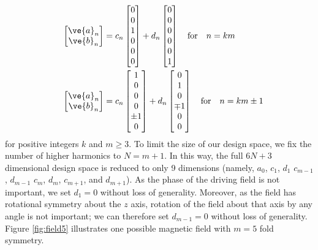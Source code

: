 \begin{align}
    \quad \begin{bmatrix} \ve{a}_{n} \\ \ve{b}_{n} \end{bmatrix} &= c_{n} \begin{bmatrix} 0\\0\\1\\0\\0\\0 \end{bmatrix} + d_{n} \begin{bmatrix} 0\\0\\0\\0\\0\\1 \end{bmatrix} \quad \text{for} \quad n=km
    \\
    \quad \begin{bmatrix} \ve{a}_{n} \\ \ve{b}_{n} \end{bmatrix} &= c_{n} \begin{bmatrix} 1\\0\\0\\0\\\pm1\\0 \end{bmatrix} + d_{n} \begin{bmatrix} 0\\1\\0\\\mp1\\0\\0 \end{bmatrix} \quad \text{for} \quad n=km \pm 1
\end{align}
for positive integers $k$ and $m\geq3$. To limit the size of our design space, we fix the number of higher harmonics to $N=m+1$. In this way, the full $6N+3$ dimensional design space is reduced to only 9 dimensions (namely, $a_0$, $c_1$, $d_1$ $c_{m-1}$, $d_{m-1}$ $c_{m}$, $d_{m}$, $c_{m+1}$, and $d_{m+1}$). As the phase of the driving field is not important, we set $d_1=0$ without loss of generality.  Moreover, as the field has rotational symmetry about the $z$ axis, rotation of the field about that axis by any angle is not important; we can therefore set $d_{m-1}=0$ without loss of generality.  Figure \ref{fig:field5} illustrates one possible magnetic field with $m=5$ fold symmetry.


